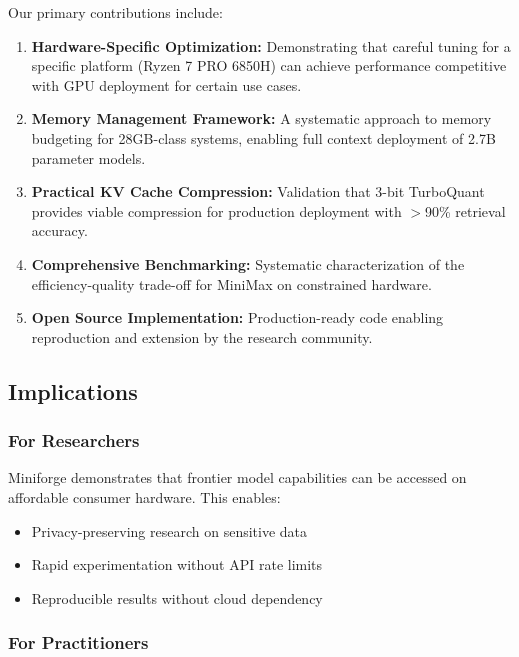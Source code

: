 Our primary contributions include:

\begin{enumerate}
    \item \textbf{Hardware-Specific Optimization:} Demonstrating that careful tuning for a specific platform (Ryzen 7 PRO 6850H) can achieve performance competitive with GPU deployment for certain use cases.
    
    \item \textbf{Memory Management Framework:} A systematic approach to memory budgeting for 28GB-class systems, enabling full context deployment of 2.7B parameter models.
    
    \item \textbf{Practical KV Cache Compression:} Validation that 3-bit TurboQuant provides viable compression for production deployment with $>$90\% retrieval accuracy.
    
    \item \textbf{Comprehensive Benchmarking:} Systematic characterization of the efficiency-quality trade-off for MiniMax on constrained hardware.
    
    \item \textbf{Open Source Implementation:} Production-ready code enabling reproduction and extension by the research community.
\end{enumerate}

\subsection{Implications}

\subsubsection{For Researchers}

Miniforge demonstrates that frontier model capabilities can be accessed on affordable consumer hardware. This enables:

\begin{itemize}
    \item Privacy-preserving research on sensitive data
    \item Rapid experimentation without API rate limits
    \item Reproducible results without cloud dependency
\end{itemize}

\subsubsection{For Practitioners}

